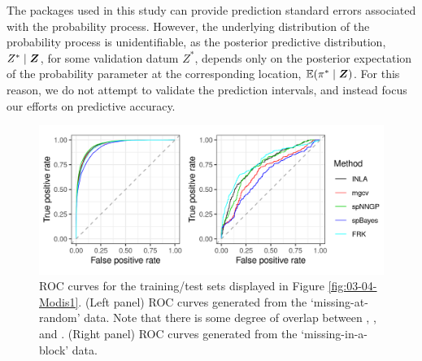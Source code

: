 \documentclass[nojss]{jss}
\def\mbf#1{{%
\mathchoice%
{\hbox{\boldmath$\displaystyle{#1}$}}%
{\hbox{\boldmath$\textstyle{#1}$}}%
{\hbox{\boldmath$\scriptstyle{#1}$}}%
{\hbox{\boldmath$\scriptscriptstyle{#1}$}}%
}}
\def\vec{\mbf}
\newcommand{\ENoLR}[1]{\mathbb{E}(#1)} %
\begin{document}
 
The packages used in this study can provide prediction standard errors associated with the probability process. 
However, the underlying distribution of the probability process is unidentifiable, as the posterior predictive distribution, ${Z^*} \mid \vec{Z}$, for some validation datum ${Z^*}$, depends only on the posterior expectation of the probability parameter at the corresponding location, $\ENoLR{\pi^* \mid \vec{Z}}$.
For this reason, we do not attempt to validate the prediction intervals, and instead focus our efforts on predictive accuracy.
\begin{figure}[t!]
    \centering
    \includegraphics[width = \linewidth]{img/MODIS_ROC.png}
    \caption{ROC curves for the training/test sets displayed in Figure \ref{fig:03-04-Modis1}. (Left panel) ROC curves generated from the `missing-at-random' data. Note that there is some degree of overlap between , , and . (Right panel) ROC curves generated from the `missing-in-a-block' data. } 
  \label{fig:MODIS:ROC}
\end{figure}
\end{document}
